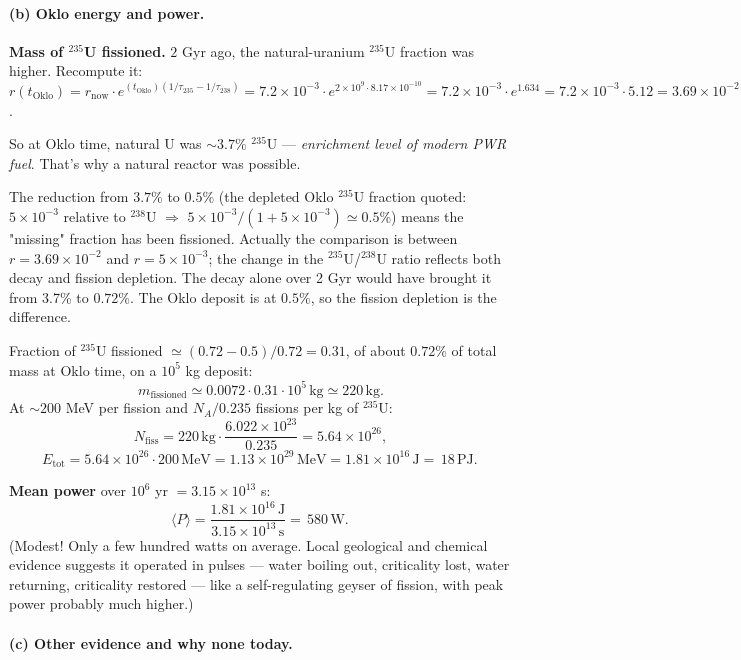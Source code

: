 \documentclass[11pt]{article}
\newcommand{\MeV}{\,\mathrm{MeV}}
\begin{document}
\paragraph{(b) Oklo energy and power.}

\textbf{Mass of $^{235}$U fissioned.} $2$ Gyr ago, the natural-uranium $^{235}$U fraction was higher. Recompute it: $r(t_\mathrm{Oklo})=r_\mathrm{now}\cdot e^{(t_\mathrm{Oklo})(1/\tau_{235}-1/\tau_{238})}=7.2\times 10^{-3}\cdot e^{2\times 10^{9}\cdot 8.17\times 10^{-10}}=7.2\times 10^{-3}\cdot e^{1.634}=7.2\times 10^{-3}\cdot 5.12=3.69\times 10^{-2}$.

So at Oklo time, natural U was $\sim 3.7\%$ $^{235}$U — \emph{enrichment level of modern PWR fuel}. That's why a natural reactor was possible.

The reduction from $3.7\%$ to $0.5\%$ (the depleted Oklo $^{235}$U fraction quoted: $5\times 10^{-3}$ relative to $^{238}$U $\Rightarrow$ $5\times 10^{-3}/(1+5\times 10^{-3})\simeq 0.5\%$) means the "missing" fraction has been fissioned. Actually the comparison is between $r=3.69\times 10^{-2}$ and $r=5\times 10^{-3}$; the change in the $^{235}$U/$^{238}$U ratio reflects both decay and fission depletion. The decay alone over 2 Gyr would have brought it from 3.7\% to $0.72\%$. The Oklo deposit is at $0.5\%$, so the fission depletion is the difference.

Fraction of $^{235}$U fissioned $\simeq(0.72-0.5)/0.72=0.31$, of about $0.72\%$ of total mass at Oklo time, on a $10^{5}$ kg deposit:
\[
m_\mathrm{fissioned}\simeq 0.0072\cdot 0.31\cdot 10^{5}\,\mathrm{kg}\simeq 220\,\mathrm{kg}.
\]
At $\sim 200$ MeV per fission and $N_A/0.235$ fissions per kg of $^{235}$U:
\[
N_\mathrm{fiss}=220\,\mathrm{kg}\cdot\frac{6.022\times 10^{23}}{0.235}=5.64\times 10^{26},
\]
\[
E_\mathrm{tot}=5.64\times 10^{26}\cdot 200\MeV=1.13\times 10^{29}\MeV=1.81\times 10^{16}\,\mathrm{J}=\boxed{\,18\,\mathrm{PJ}.\,}
\]

\textbf{Mean power} over $10^{6}$ yr $=3.15\times 10^{13}$ s:
\[
\langle P\rangle=\frac{1.81\times 10^{16}\,\mathrm{J}}{3.15\times 10^{13}\,\mathrm{s}}=\boxed{\,580\,\mathrm{W}.\,}
\]
(Modest! Only a few hundred watts on average. Local geological and chemical evidence suggests it operated in pulses — water boiling out, criticality lost, water returning, criticality restored — like a self-regulating geyser of fission, with peak power probably much higher.)

\paragraph{(c) Other evidence and why none today.}
\end{document}
